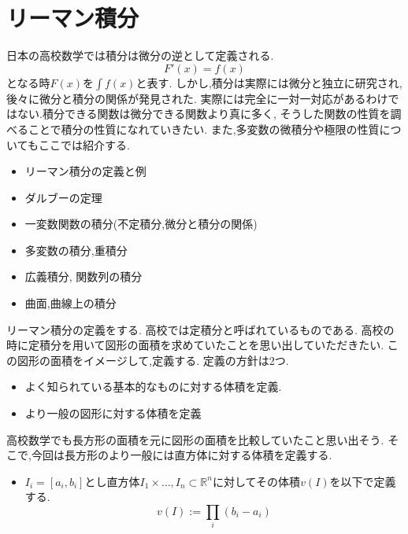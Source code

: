 \section{リーマン積分}

日本の高校数学では積分は微分の逆として定義される.
\begin{equation*}
 F'(x) = f(x)
\end{equation*}
となる時$F(x)$を$\int f(x)$と表す.
しかし,積分は実際には微分と独立に研究され,後々に微分と積分の関係が発見された.
実際には完全に一対一対応があるわけではない.積分できる関数は微分できる関数より真に多く,
そうした関数の性質を調べることで積分の性質になれていきたい.
また,多変数の微積分や極限の性質についてもここでは紹介する.

\begin{itemize}
\item リーマン積分の定義と例
\item ダルブーの定理
\item 一変数関数の積分(不定積分,微分と積分の関係)
\item 多変数の積分,重積分
\item 広義積分, 関数列の積分
\item 曲面,曲線上の積分
\end{itemize}


リーマン積分の定義をする.
高校では定積分と呼ばれているものである.
高校の時に定積分を用いて図形の面積を求めていたことを思い出していただきたい.
この図形の面積をイメージして,定義する.
定義の方針は2つ.
\begin{itemize}
  \item よく知られている基本的なものに対する体積を定義.
  \item より一般の図形に対する体積を定義
\end{itemize}

高校数学でも長方形の面積を元に図形の面積を比較していたこと思い出そう.
そこで,今回は長方形のより一般には直方体に対する体積を定義する.
\begin{itemize}
  \item $I_i = [a_i, b_i]$とし直方体$I_1 \times  \ldots, I_n \subset \mathbb{R}^n$に対してその体積$v(I)$を以下で定義する.
  \begin{equation*}
  v(I) := \prod_i (b_i - a_i)
  \end{equation*}
\end{itemize}

